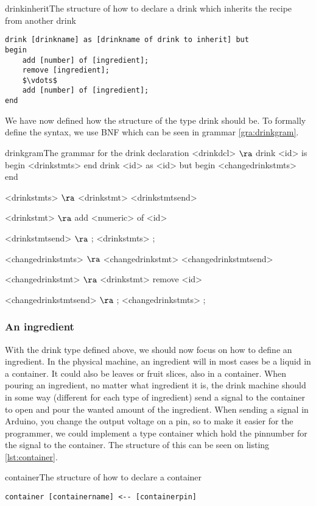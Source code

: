 \begin{code}{drinkinherit}{The structure of how to declare a drink which inherits the recipe from another drink}
\begin{lstlisting}[mathescape]
drink [drinkname] as [drinkname of drink to inherit] but
begin
	add [number] of [ingredient];
	remove [ingredient];
	$\vdots$
	add [number] of [ingredient];
end
\end{lstlisting}
\end{code}

We have now defined how the structure of the type drink should be. To formally define the syntax, we use BNF which can be seen in grammar \ref{gra:drinkgram}.

\begin{grammatik}{drinkgram}{The grammar for the drink declaration}
<drinkdcl> $\ra$ drink <id> is begin <drinkstmts> end
\alt drink <id> as <id> but begin <changedrinkstmts> end

<drinkstmts> $\ra$ <drinkstmt> <drinkstmtsend>

<drinkstmt> $\ra$ add <numeric> of <id>

<drinkstmtsend> $\ra$ ; <drinkstmts>
\alt ;

<changedrinkstmts> $\ra$ <changedrinkstmt> <changedrinkstmtsend>

<changedrinkstmt> $\ra$ <drinkstmt>
\alt remove <id>

<changedrinkstmtsend> $\ra$ ; <changedrinkstmts>
\alt ;
\end{grammatik}

\subsubsection{An ingredient}
With the drink type defined above, we should now focus on how to define an ingredient. In the physical machine, an ingredient will in most cases be a liquid in a container. It could also be leaves or fruit slices, also in a container. When pouring an ingredient, no matter what ingredient it is, the drink machine should in some way (different for each type of ingredient) send a signal to the container to open and pour the wanted amount of the ingredient. When sending a signal in Arduino, you change the output voltage on a pin, so to make it easier for the programmer, we could implement a type container which hold the pinnumber for the signal to the container. The structure of this can be seen on listing \ref{lst:container}.

\begin{code}{container}{The structure of how to declare a container}
\begin{lstlisting}[mathescape]
container [containername] <-- [containerpin]
\end{lstlisting}
\end{code}

